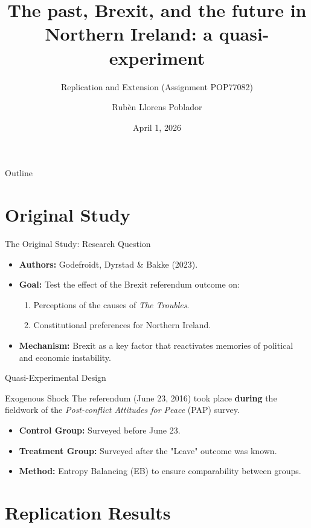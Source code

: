 \documentclass[10pt]{beamer}
\title[Replication: Brexit in NI]{The past, Brexit, and the future in Northern Ireland: a quasi-experiment}
\subtitle{Replication and Extension (Assignment POP77082)}
\author{Rubèn Llorens Poblador}
\date{April 1, 2026}
\begin{document}
	
	\begin{frame}
		\titlepage
	\end{frame}
	
	\begin{frame}{Outline}
		\tableofcontents
	\end{frame}
	
	\section{Original Study}
	
	\begin{frame}{The Original Study: Research Question}
		\begin{itemize}
			\item \textbf{Authors:} Godefroidt, Dyrstad \& Bakke (2023).
			\item \textbf{Goal:} Test the effect of the Brexit referendum outcome on:
			\begin{enumerate}
				\item Perceptions of the causes of \textit{The Troubles}.
				\item Constitutional preferences for Northern Ireland.
			\end{enumerate}
			\item \textbf{Mechanism:} Brexit as a key factor that reactivates memories of political and economic instability.
		\end{itemize}
	\end{frame}
	
	\begin{frame}{Quasi-Experimental Design}
		\begin{block}{Exogenous Shock}
			The referendum (June 23, 2016) took place \textbf{during} the fieldwork of the \textit{Post-conflict Attitudes for Peace} (PAP) survey.
		\end{block}
		\begin{itemize}
			\item \textbf{Control Group:} Surveyed before June 23.
			\item \textbf{Treatment Group:} Surveyed after the "Leave" outcome was known.
			\item \textbf{Method:} Entropy Balancing (EB) to ensure comparability between groups.
		\end{itemize}
	\end{frame}
	
	\section{Replication Results}
	
\end{document}

